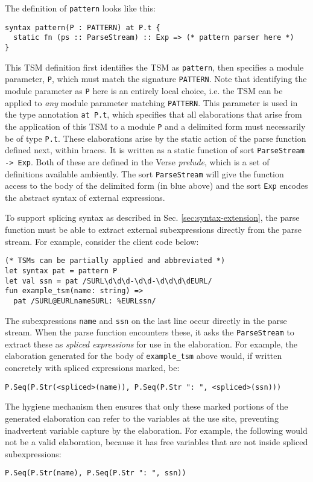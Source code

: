 The definition of \lstinline{pattern} looks like this:
\begin{lstlisting}[numbers=none]
syntax pattern(P : PATTERN) at P.t {
  static fn (ps :: ParseStream) :: Exp => (* pattern parser here *)
}
\end{lstlisting}
This TSM definition first identifies the TSM as \lstinline{pattern}, then specifies a module parameter, \lstinline{P}, which must match the signature \lstinline{PATTERN}. Note that identifying the module parameter as \lstinline{P} here is an entirely local choice, i.e. the TSM can be applied to \emph{any} module parameter matching  \lstinline{PATTERN}. This parameter is used in the type annotation \lstinline{at P.t}, which specifies that all elaborations that arise from the application of this TSM to a module \lstinline{P} and a delimited form must necessarily be of type \lstinline{P.t}. These elaborations arise by the static action of the parse function defined next, within braces. It is written as a static function of sort \lstinline{ParseStream -> Exp}.  Both of these are defined in the Verse \emph{prelude}, which is a set of definitions available ambiently. The sort \lstinline{ParseStream} will give the function access to the {body} of the delimited form (in blue above) and the sort \lstinline{Exp}  encodes the abstract syntax of external expressions. %

To support splicing syntax as described in Sec. \ref{sec:syntax-extension}, the parse function must be able to extract external subexpressions directly from the parse stream. For example, consider the client code below:
\begin{lstlisting}[numbers=none]
(* TSMs can be partially applied and abbreviated *)
let syntax pat = pattern P
let val ssn = pat /SURL\d\d\d-\d\d-\d\d\d\dEURL/
fun example_tsm(name: string) => 
  pat /SURL@EURLnameSURL: %EURLssn/
\end{lstlisting}
The subexpressions \lstinline{name} and \lstinline{ssn} on the last line occur directly in the parse stream. When the parse function encounters these, it asks the \lstinline{ParseStream} to extract these as \emph{spliced expressions} for use in the elaboration. For example, the elaboration generated for the body of \lstinline{example_tsm} above would, if written concretely with spliced expressions marked, be:
\begin{lstlisting}[numbers=none]
P.Seq(P.Str(<spliced>(name)), P.Seq(P.Str ": ", <spliced>(ssn)))
\end{lstlisting}
The hygiene mechanism then ensures that only these marked portions of the generated elaboration can refer to the variables at the use site, preventing inadvertent variable capture by the elaboration. For example, the following would not be a valid elaboration, because it has free variables that are not inside spliced subexpressions:
\begin{lstlisting}[numbers=none]
P.Seq(P.Str(name), P.Seq(P.Str ": ", ssn))
\end{lstlisting}

